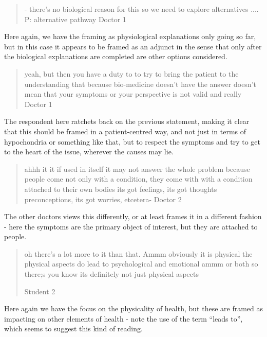
\begin{quotation}
  - there's no biological reason for this so we need to explore alternatives 
....
P: alternative pathway
Doctor 1
\end{quotation}

Here again, we have the framing as physiological explanations only going so far, but in this case it appears to be framed as an adjunct in the sense that only after the biological explanations are completed are other options considered. 

\begin{quotation}
  yeah, but then you have a duty to to try to bring the patient to the understanding that because bio-medicine doesn't have the answer doesn't mean that your symptoms or your perspective is not valid and really 
Doctor 1
\end{quotation}


The respondent here ratchets back on the previous statement, making it clear that this should be framed in a patient-centred way, and not just in terms of hypochondria or something like that, but to respect the symptoms and try to get to the heart of the issue, wherever the causes may lie. 

\begin{quotation}
  ahhh it it if used in itself it may not answer the whole problem because people come not only with a condition, they come with with a condition attached to their own bodies its got feelings, its got thoughts preconceptions, its got worries, etcetera-
Doctor 2
\end{quotation}


The other doctors views this differently, or at least frames it in a different fashion - here the symptoms are the primary object of interest, but they are attached to people. 

\begin{quotation}
  oh there's a lot more to it than that. Ammm obviously it is physical the physical aspects do lead to psychological and emotional ammm or both so there;s you know its definitely not just physical aspects 

Student 2
\end{quotation}

Here again we have the focus on the physicality of health, but these are framed as impacting on other elements of health - note the use of the term ``leads to'', which seems to suggest this kind of reading. 



